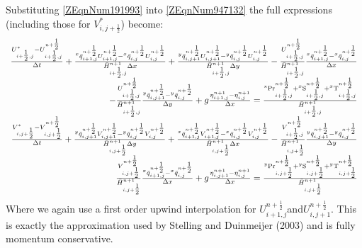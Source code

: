\documentclass{article}
\begin{document}
\noindent Substituting \eqref{ZEqnNum191993} into \eqref{ZEqnNum947132} the full expressions (including those for $V_{i,j+{\tfrac{1}{2}} }^{*} $) become:
\begin{equation} \label{ZEqnNum184179} 
\begin{array}{r} {\frac{U_{i+{\tfrac{1}{2}} ,j}^{*} -U_{i+{\tfrac{1}{2}} ,j}^{n+{\tfrac{1}{2}} } }{\Delta t} +\frac{{}^{x} \bar{q}_{i+1,j}^{n+{\tfrac{1}{2}} } U_{i+1,j}^{n+{\tfrac{1}{2}} } -{}^{x} \bar{q}_{i,j}^{n+{\tfrac{1}{2}} } U_{i,j}^{n+{\tfrac{1}{2}} } }{\bar{H}_{i+{\tfrac{1}{2}} ,j}^{n+1} \Delta x} +\frac{{}^{y} \bar{q}_{i,j+1}^{n+{\tfrac{1}{2}} } U_{i,j+1}^{n+{\tfrac{1}{2}} } -{}^{y} \bar{q}_{i,j}^{n+{\tfrac{1}{2}} } U_{i,j}^{n+{\tfrac{1}{2}} } }{\bar{H}_{i+{\tfrac{1}{2}} ,j}^{n+1} \Delta y} -\frac{U_{i+{\tfrac{1}{2}} ,j}^{n+{\tfrac{1}{2}} } }{\bar{H}_{i+{\tfrac{1}{2}} ,j}^{n+1} } \frac{{}^{x} \bar{q}_{i+1,j}^{n+{\tfrac{1}{2}} } -{}^{x} \bar{q}_{i,j}^{n+{\tfrac{1}{2}} } }{\Delta x} } \\ {-\frac{U_{i+{\tfrac{1}{2}} ,j}^{n+{\tfrac{1}{2}} } }{\bar{H}_{i+{\tfrac{1}{2}} ,j}^{n+1} } \frac{{}^{y} \bar{q}_{i,j+1}^{n+{\tfrac{1}{2}} } -{}^{y} \bar{q}_{i,j}^{n+{\tfrac{1}{2}} } }{\Delta y} +g\frac{\eta _{i+1,j}^{n+1} -\eta _{i,j}^{n+1} }{\Delta x} =\frac{^{{\rm x}} {\rm Pr}_{i+{\tfrac{1}{2}} ,j}^{n+{\tfrac{1}{2}} } +{}^{x} {\rm S}_{i+{\tfrac{1}{2}} ,j}^{n+{\tfrac{1}{2}} } +{}^{x} {\rm T}_{i+{\tfrac{1}{2}} ,j}^{n+{\tfrac{1}{2}} } }{\bar{H}_{i+{\tfrac{1}{2}} ,j}^{n+1} } } \\ {\frac{V_{i,j+{\tfrac{1}{2}} }^{*} -V_{i,j+{\tfrac{1}{2}} }^{n+{\tfrac{1}{2}} } }{\Delta t} +\frac{{}^{y} \bar{q}_{i,j+1}^{n+{\tfrac{1}{2}} } V_{i,j+1}^{n+{\tfrac{1}{2}} } -{}^{y} \bar{q}_{i,j}^{n+{\tfrac{1}{2}} } V_{i,j}^{n+{\tfrac{1}{2}} } }{\bar{H}_{i,j+{\tfrac{1}{2}} }^{n+1} \Delta y} +\frac{{}^{x} \bar{q}_{i+1,j}^{n+{\tfrac{1}{2}} } V_{i+1,j}^{n+{\tfrac{1}{2}} } -{}^{x} \bar{q}_{i,j}^{n+{\tfrac{1}{2}} } V_{i,j}^{n+{\tfrac{1}{2}} } }{\bar{H}_{i,j+{\tfrac{1}{2}} }^{n+1} \Delta x} -\frac{V_{i+{\tfrac{1}{2}} ,j}^{n+{\tfrac{1}{2}} } }{\bar{H}_{i,j+{\tfrac{1}{2}} }^{n+1} } \frac{{}^{y} \bar{q}_{i,j+1}^{n+{\tfrac{1}{2}} } -{}^{y} \bar{q}_{i,j}^{n+{\tfrac{1}{2}} } }{\Delta y} } \\ {\frac{V_{i,j+{\tfrac{1}{2}} }^{n+{\tfrac{1}{2}} } }{\bar{H}_{i,j+{\tfrac{1}{2}} }^{n+1} } \frac{{}^{x} \bar{q}_{i+1,j}^{n+{\tfrac{1}{2}} } -{}^{x} \bar{q}_{i,j}^{n+{\tfrac{1}{2}} } }{\Delta x} +g\frac{\eta _{i,j+1}^{n+1} -\eta _{i,j}^{n+1} }{\Delta x} =\frac{{}^{y} {\rm Pr}_{i,j+{\tfrac{1}{2}} }^{n+{\tfrac{1}{2}} } +{}^{y} {\rm S}_{i,j+{\tfrac{1}{2}} }^{n+{\tfrac{1}{2}} } +{}^{y} {\rm T}_{i,j+{\tfrac{1}{2}} }^{n+{\tfrac{1}{2}} } }{\bar{H}_{i,j+{\tfrac{1}{2}} }^{n+1} } } \end{array} 
\end{equation} 
Where we again use a first order upwind interpolation for $U_{i+1,j}^{n+{\tfrac{1}{2}} } $and$U_{i,j+1}^{n+{\tfrac{1}{2}} } $. This is exactly the approximation used by Stelling and Duinmeijer (2003) and is fully momentum conservative. 
\end{document}
